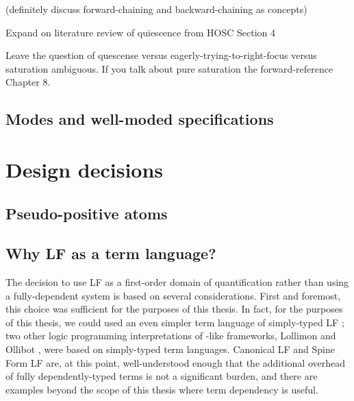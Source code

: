 (definitely discuss forward-chaining and backward-chaining as concepts)

Expand on literature review of quiescence from HOSC Section 4

Leave the question of quescense versus eagerly-trying-to-right-focus
versus saturation ambiguous. If you talk about pure saturation the
forward-reference Chapter 8. 

\subsection{Modes and well-moded specifications}
\label{sec:framework-modes}

\section{Design decisions}
\label{sec:designdecisions}

\subsection{Pseudo-positive atoms}
\label{sec:pseudopositive}


\subsection{Why LF as a term language?}
\label{sec:why-not-fully-dependent}

The decision to use LF as a first-order domain of quantification
rather than using a fully-dependent system is based on several
considerations. First and foremost, this choice was sufficient for the
purposes of this thesis. In fact, for the purposes of this thesis, we
could used an even simpler term language of simply-typed LF
\cite{pfenning08church}; two other logic programming interpretations
of \sls-like frameworks, Lollimon \cite{lopez05monadic} and Ollibot
\cite{pfenning09substructural}, were based on simply-typed term
languages. Canonical LF and Spine Form LF are, at this point,
well-understood enough that the additional overhead of fully
dependently-typed terms is not a significant burden, and there are
examples beyond the scope of this thesis where term dependency is
useful.

